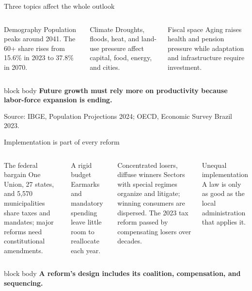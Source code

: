 \documentclass[10pt,aspectratio=169]{beamer}
\newcommand{\source}[1]{%
  \par\vfill{\tiny\color{MidGray}Source: #1}}
\newcommand{\question}[1]{%
  \begin{beamercolorbox}[rounded=true,sep=0.55em,wd=\textwidth]{block body}
    \centering\large\textbf{#1}
  \end{beamercolorbox}}
\begin{document}
\begin{frame}{Three topics affect the whole outlook}
  \begin{columns}[T,onlytextwidth]
      \begin{block}{Demography}
        Population peaks around 2041. The 60+ share rises from 15.6\% in 2023 to 37.8\% in 2070.
      \end{block}
      \begin{block}{Climate}
        Droughts, floods, heat, and land-use pressure affect capital, food, energy, and cities.
      \end{block}
      \begin{block}{Fiscal space}
        Aging raises health and pension pressure while adaptation and infrastructure require investment.
      \end{block}
  \end{columns}
  \vspace{.7cm}
  \question{Future growth must rely more on productivity because labor-force expansion is ending.}
  \source{IBGE, Population Projections 2024; OECD, Economic Survey Brazil 2023.}
\end{frame}

\begin{frame}{Implementation is part of every reform}
  \begin{columns}[T,onlytextwidth]
      \begin{block}{The federal bargain}
        One Union, 27 states, and 5,570 municipalities share taxes and mandates; major reforms need constitutional amendments.
      \end{block}
      \vspace{.15cm}
      \begin{block}{A rigid budget}
        Earmarks and mandatory spending leave little room to reallocate each year.
      \end{block}
      \begin{block}{Concentrated losers, diffuse winners}
        Sectors with special regimes organize and litigate; winning consumers are dispersed. The 2023 tax reform passed by compensating losers over decades.
      \end{block}
      \vspace{.15cm}
      \begin{block}{Unequal implementation}
        A law is only as good as the local administration that applies it.
      \end{block}
  \end{columns}
  \vspace{.25cm}
  \question{A reform's design includes its coalition, compensation, and sequencing.}
\end{frame}
\end{document}
